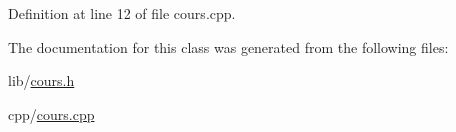 Definition at line 12 of file cours.\+cpp.



The documentation for this class was generated from the following files\+:\begin{DoxyCompactItemize}
\item 
lib/\hyperlink{cours_8h}{cours.\+h}\item 
cpp/\hyperlink{cours_8cpp}{cours.\+cpp}\end{DoxyCompactItemize}
